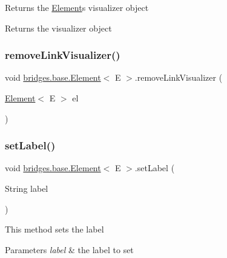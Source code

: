 Returns the \mbox{\hyperlink{classbridges_1_1base_1_1_element}{Element}}\textquotesingle{}s visualizer object

\begin{DoxyReturn}{Returns}
the visualizer object 
\end{DoxyReturn}
\mbox{\label{classbridges_1_1base_1_1_element_a144cd54e043a801fab326769a5da01e2}} 
\subsubsection{\texorpdfstring{remove\+Link\+Visualizer()}{removeLinkVisualizer()}}
{\footnotesize\ttfamily void \mbox{\hyperlink{classbridges_1_1base_1_1_element}{bridges.\+base.\+Element}}$<$ E $>$.remove\+Link\+Visualizer (\begin{DoxyParamCaption}\item[{\mbox{\hyperlink{classbridges_1_1base_1_1_element}{Element}}$<$ E $>$}]{el }\end{DoxyParamCaption})\hspace{0.3cm}{\ttfamily [protected]}}

\mbox{\label{classbridges_1_1base_1_1_element_a942ccd766aeca0c4fdbe27ef8cbe78d9}} 
\subsubsection{\texorpdfstring{set\+Label()}{setLabel()}}
{\footnotesize\ttfamily void \mbox{\hyperlink{classbridges_1_1base_1_1_element}{bridges.\+base.\+Element}}$<$ E $>$.set\+Label (\begin{DoxyParamCaption}\item[{String}]{label }\end{DoxyParamCaption})}

This method sets the label


\begin{DoxyParams}{Parameters}
{\em label} & the label to set \\
\hline
\end{DoxyParams}
\mbox{\label{classbridges_1_1base_1_1_element_af6251f52b9d277dd77e3bab1829d0197}} 
